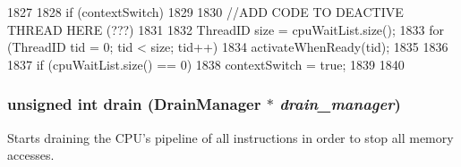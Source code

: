 \begin{DoxyCode}
1827 {
1828     if (contextSwitch) {
1829 
1830         //ADD CODE TO DEACTIVE THREAD HERE (???)
1831 
1832         ThreadID size = cpuWaitList.size();
1833         for (ThreadID tid = 0; tid < size; tid++) {
1834             activateWhenReady(tid);
1835         }
1836 
1837         if (cpuWaitList.size() == 0)
1838             contextSwitch = true;
1839     }
1840 }
\end{DoxyCode}
\hypertarget{classFullO3CPU_a4e932bfc8aa6dfb998b8496a0f04ace3}{
\subsubsection[{drain}]{\setlength{\rightskip}{0pt plus 5cm}unsigned int drain ({\bf DrainManager} $\ast$ {\em drain\_\-manager})}}
\label{classFullO3CPU_a4e932bfc8aa6dfb998b8496a0f04ace3}
Starts draining the CPU's pipeline of all instructions in order to stop all memory accesses. 



